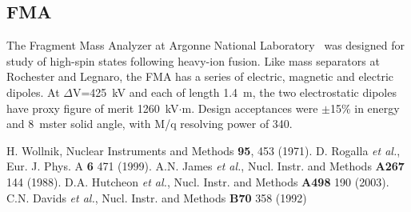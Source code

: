 \documentclass[12pt]{amsart}
\begin{document}
\subsection{FMA}
The Fragment Mass Analyzer at Argonne National Laboratory~\cite{Da92} was designed for study of high-spin states following heavy-ion fusion.  Like mass separators at Rochester and Legnaro, the FMA has a series of electric, magnetic and electric dipoles.   At $\Delta$V=425~kV and each of length 1.4~m, the two electrostatic dipoles have proxy figure of merit 1260~kV$\cdot$m.  Design acceptances were $\pm$15\% in energy and 8~mster solid angle, with M/q resolving power of 340.


\begin{thebibliography}{99}
 H. Wollnik, Nuclear Instruments and Methods {\bf 95}, 453 (1971).
 D. Rogalla {\em et al.}, Eur. J. Phys. A {\bf 6} 471 (1999).
 A.N. James {\em et al.}, Nucl. Instr. and Methods {\bf A267} 144 (1988).
 D.A. Hutcheon {\em et al.}, Nucl. Instr. and Methods {\bf A498} 190 (2003).
 C.N. Davids {\em et al.},  Nucl. Instr. and Methods {\bf B70} 358 (1992)
\end{thebibliography}
 
\end{document}
